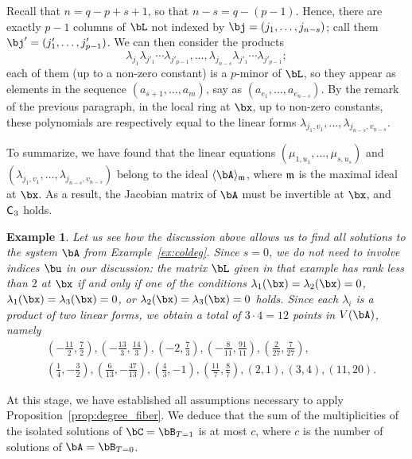 \documentclass[12pt]{article}
\newtheorem{example}[definition]{Example}
\begin{document}
Recall that $n=q-p+s+1$, so that $n-s = q-(p-1)$. Hence, there are
exactly $p-1$ columns of $\bL$ not indexed by $\bj=(j_1,\dots,j_{n-s})$; call
them $\bj'=(j'_1,\dots,j'_{p-1})$. We can then consider the 
products
$$ \lambda_{j_1} \lambda_{j'_1} \cdots \lambda_{j'_{p-1}},\dots, \lambda_{j_{n-s}}
\lambda_{j'_1} \cdots \lambda_{j'_{p-1}};$$ each of them (up to a non-zero
constant) is a $p$-minor of $\bL$, so they appear as elements in the
sequence $(a_{s+1},\dots,a_m)$, say as
$(a_{e_1},\dots,a_{e_{n-s}})$. By the remark of the previous
paragraph, in the local ring at $\bx$, up to non-zero constants, these
polynomials are respectively equal to the linear forms
$\lambda_{j_1,v_1},\dots,\lambda_{j_{n-s},v_{n-s}}$.  

To summarize, we have found that the linear equations
$(\mu_{1,u_1},\dots,\mu_{s,u_s})$ and
$(\lambda_{j_1,v_1},\dots,\lambda_{j_{n-s},v_{n-s}})$ belong to the
ideal $\langle \bA \rangle_\m$, where $\mathfrak{m}$ is the maximal ideal at
$\bx$. As a result, the Jacobian matrix of $\bA$ must be invertible
at $\bx$, and $\mathsf{C}_3$ holds.

\begin{example}\label{ex:12pts}
  Let us see how the discussion above allows us to find all solutions
  to the system $\bA$ from Example~\ref{ex:coldeg}. Since $s=0$, we do
  not need to involve indices $\bu$ in our discussion: the matrix
  $\bL$ given in that example has rank less than $2$ at $\bx$ if and
  only if one of the conditions $\lambda_1(\bx)=\lambda_2(\bx)=0$,
  $\lambda_1(\bx)=\lambda_3(\bx)=0$, or
  $\lambda_2(\bx)=\lambda_3(\bx)=0$ holds. Since each $\lambda_i$
  is a product of two linear forms, we obtain a total of $3 \cdot 4 = 12$ 
  points in $V(\bA)$, namely
  \begin{align*}
&  (-\frac{11}2, \frac 72), (-\frac{13}3, \frac{14}3), (-2, \frac 73), (-\frac 8{11}, \frac{91}{11}), (\frac 2{27}, \frac 7{27}), \\ 
&  (\frac 14, -\frac 32), (\frac 6{13}, -\frac{47}{13}), (\frac 43, -1), (\frac {11}7, \frac 87), (2, 1), (3, 4), (11, 20).
  \end{align*}
\end{example}


\medskip

At this stage, we have established all assumptions necessary to apply
Proposition~\ref{prop:degree_fiber}. We deduce that the sum of the
multiplicities of the isolated solutions of $\bC=\bB_{T=1}$ is at most
$c$, where $c$ is the number of solutions of $\bA=\bB_{T=0}$.
\end{document}
